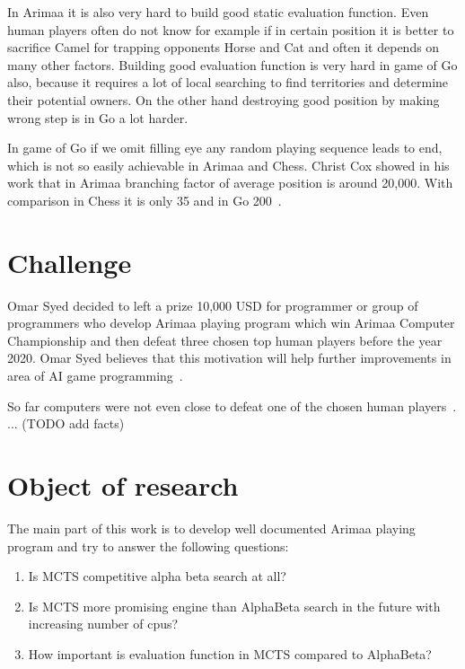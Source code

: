 In Arimaa it is also very hard to build good static evaluation function. Even
human players often do not know for example if in certain position it is better
to sacrifice Camel for trapping opponents Horse and Cat and often it depends on
many other factors. Building good evaluation function is very hard in game of
Go also, because it requires a lot of local searching to find territories and
determine their potential owners. On the other hand destroying good position by
making wrong step is in Go a lot harder.

In game of Go if we omit filling eye any random playing sequence leads to end,
which is not so easily achievable in Arimaa and Chess. Christ Cox showed in his
work that in Arimaa branching factor of average position is around 20,000. With
comparison in Chess it is only 35 and in Go 200~\cite{COX}.


\section{Challenge}
Omar Syed decided to left a prize 10,000 USD for programmer or group of
programmers who develop Arimaa playing program which win Arimaa Computer
Championship and then defeat three chosen top human players before the year
2020. Omar Syed believes that this motivation will help further improvements in
area of AI game programming~\cite{syed}.

So far computers were not even close to defeat one of the chosen human
players~\cite{arimaa.com}. ... (TODO add facts)

\section{Object of research}
The main part of this work is to develop well documented Arimaa playing program
and try to answer the following questions:

\begin{enumerate}
\item Is MCTS competitive alpha beta search at all?
\item Is MCTS more promising engine than AlphaBeta search in the future with
      increasing number of cpus?
\item How important is evaluation function in MCTS compared to AlphaBeta?
\end{enumerate}

